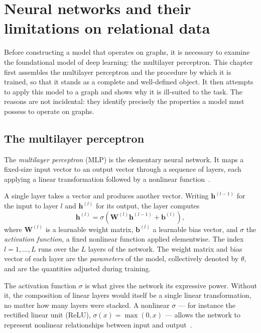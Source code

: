 \chapter{Neural networks and their limitations on relational data}
\label{ch:nn-limitations}
\minitoc

Before constructing a model that operates on graphs, it is necessary to
examine the foundational model of deep learning: the multilayer perceptron.
This chapter first assembles the multilayer
perceptron and the procedure by which it is trained, so that it stands as a
complete and well-defined object. It then attempts to apply this model to a
graph and shows why it is ill-suited to the task. The reasons are not
incidental: they identify precisely the properties a model must possess to
operate on graphs.

\section{The multilayer perceptron}
\label{sec:mlp}

The \textit{multilayer perceptron} (MLP) is the elementary neural
network. It maps a fixed-size input vector to an
output vector through a sequence of layers, each applying a linear
transformation followed by a nonlinear function~\cite{bishop2024}.

A single layer takes a vector and produces another vector. Writing
$\mathbf{h}^{(l-1)}$ for the input to layer $l$ and $\mathbf{h}^{(l)}$ for its
output, the layer computes
\begin{equation}
  \mathbf{h}^{(l)} = \sigma\!\left(
    \mathbf{W}^{(l)} \mathbf{h}^{(l-1)} + \mathbf{b}^{(l)}
  \right),
  \label{eq:mlp-layer}
\end{equation}
where $\mathbf{W}^{(l)}$ is a learnable weight matrix, $\mathbf{b}^{(l)}$ a
learnable bias vector, and $\sigma$ the \textit{activation function}, 
a fixed nonlinear function applied elementwise. The index $l = 1, \ldots, L$
runs over the $L$ layers of the network. The weight matrix and 
bias vector of each layer are the \textit{parameters} of the model,
collectively denoted by $\theta$, and are the quantities adjusted during training.

The activation function $\sigma$ is what gives the network its expressive
power. Without it, the composition of linear layers would itself be a single
linear transformation, no matter how many layers were stacked. A nonlinear
$\sigma$ — for instance the rectified linear unit (ReLU), $\sigma(x) = \max(0, x)$ —
allows the network to represent nonlinear relationships between input and
output~\cite{goodfellow2016}.

